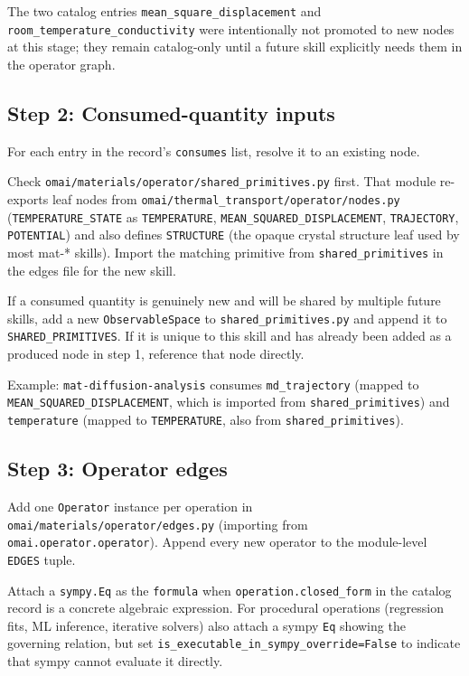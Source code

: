 \documentclass[11pt,a4paper]{article}
\begin{document}
The two catalog entries \texttt{mean\_square\_displacement} and
\texttt{room\_temperature\_conductivity} were intentionally not promoted to new
nodes at this stage; they remain catalog-only until a future skill explicitly needs
them in the operator graph.

\subsection{Step 2: Consumed-quantity inputs}

For each entry in the record's \texttt{consumes} list, resolve it to an existing
node.

Check \texttt{omai/materials/operator/shared\_primitives.py} first. That module
re-exports leaf nodes from \texttt{omai/thermal\_transport/operator/nodes.py}
(\texttt{TEMPERATURE\_STATE} as \texttt{TEMPERATURE},
\texttt{MEAN\_SQUARED\_DISPLACEMENT}, \texttt{TRAJECTORY}, \texttt{POTENTIAL}) and
also defines \texttt{STRUCTURE} (the opaque crystal structure leaf used by most
mat-* skills). Import the matching primitive from \texttt{shared\_primitives} in
the edges file for the new skill.

If a consumed quantity is genuinely new and will be shared by multiple future
skills, add a new \texttt{ObservableSpace} to \texttt{shared\_primitives.py} and
append it to \texttt{SHARED\_PRIMITIVES}. If it is unique to this skill and has
already been added as a produced node in step 1, reference that node directly.

Example: \texttt{mat-diffusion-analysis} consumes \texttt{md\_trajectory} (mapped
to \texttt{MEAN\_SQUARED\_DISPLACEMENT}, which is imported from
\texttt{shared\_primitives}) and \texttt{temperature} (mapped to
\texttt{TEMPERATURE}, also from \texttt{shared\_primitives}).

\subsection{Step 3: Operator edges}

Add one \texttt{Operator} instance per operation in
\texttt{omai/materials/operator/edges.py} (importing from
\texttt{omai.operator.operator}). Append every new operator to the module-level
\texttt{EDGES} tuple.

Attach a \texttt{sympy.Eq} as the \texttt{formula} when
\texttt{operation.closed\_form} in the catalog record is a concrete algebraic
expression. For procedural operations (regression fits, ML inference, iterative
solvers) also attach a sympy \texttt{Eq} showing the governing relation, but set
\texttt{is\_executable\_in\_sympy\_override=False} to indicate that sympy cannot
evaluate it directly.
\end{document}
